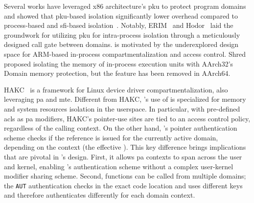 


\label{sec:related-work:ipi}
Several works have leveraged x86 architecture's \gls{pku} to protect program domains and showed that \gls{pku}-based isolation significantly lower overhead compared to process-based and \gls{sfi}-based isolation~\cite{erim,hodor,cerberus,jenny,pkrusafe}.
Notably, ERIM~\cite{erim} and Hodor~\cite{hodor} laid the groundwork for utilizing \gls{pku} for intra-process isolation through a meticulously designed call gate between domains.
\thename is motivated by the underexplored design space for ARM-based in-process compartmentalization and access control.
Shred~\cite{chen2016shreds} proposed isolating the memory of in-process execution units with AArch32's Domain memory protection, but the feature has been removed in AArch64.

HAKC~\cite{hakc} is a framework for Linux device driver compartmentalization, also leveraging \gls{pa} and \gls{mte}.
Different from HAKC, \thename's use of \pamte is specialized for memory and system resources isolation in the userspace. In particular, with pre-defined \glspl{acl} as \gls{pa} modifiers, HAKC's pointer-use sites are tied to an access control policy,  regardless of the calling context. On the other hand, \thename's pointer authentication scheme checks if the reference is issued for the currently active domain, depending on the context (the effective ).
This key difference brings implications that are pivotal in \thename's design. First, it allows \gls{pa} contexts to span across the user and kernel, enabling \thename's authentication scheme without a complex user-kernel modifier sharing scheme.
Second, functions can be called from multiple domains; the \texttt{AUT} authentication checks in the exact code location and uses different keys and therefore authenticates differently for each domain context.


